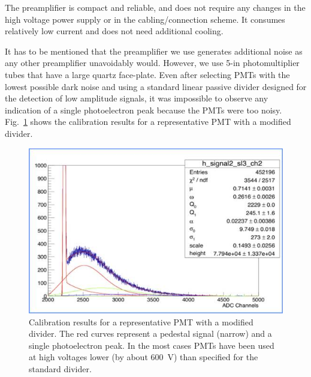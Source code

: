 The preamplifier is compact and reliable, and does not require any changes in the high voltage power supply or
in the cabling/connection scheme. It consumes relatively low current and does not need additional cooling.
 
It has to be mentioned that the preamplifier we use generates  additional noise as any other preamplifier
unavoidably would. However, we use 5-in photomultiplier tubes that have a large quartz face-plate. Even after
selecting PMTs with the lowest possible dark noise and using a standard linear passive divider designed for the
detection of low amplitude signals, it was impossible to observe any indication of a single photoelectron peak because
the PMTs were too noisy. Fig.~\ref{fig:POPOV_4} shows the calibration results for a representative PMT with a
modified divider.   


\begin{figure}[!ht]
    \centering
    \includegraphics[width=1.0\linewidth,trim={0.0cm 0.0cm 0.0cm 0.0cm},clip]{images/POPOV_4.jpg}
    \caption{Calibration results for a representative PMT with a modified divider. The red curves represent a pedestal
      signal (narrow) and a single photoelectron peak. In the most cases PMTs have been used at high voltages lower (by
      about 600~V) than specified for the standard divider.}
    \label{fig:POPOV_4}
\end{figure}

